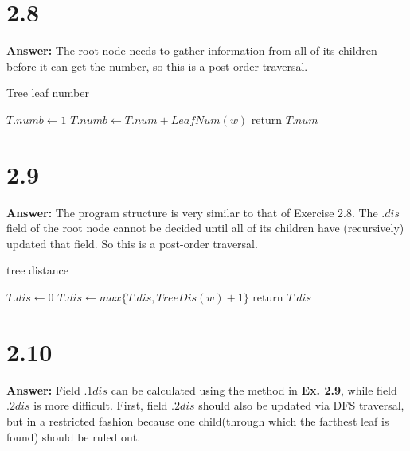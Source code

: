 \documentclass[a4paper,11pt]{article}
\theoremstyle{mytheor}
\begin{document}
\vspace{1.2in}

\section*{2.8}
\noindent\textbf{Answer:} The root node needs to gather information from all of its children before it can get the number, so this is a post-order traversal.

\begin{algorithm}[H]
\caption{Tree leaf number}\label{sec:TREEEVALUATION_2_8}
\begin{algorithmic}[1]
  \State $T.numb \gets 1$
   
    \State $T.numb \gets T.num + LeafNum(w)$
  \EndFor
  \State return $T.num$
\EndFunction
\end{algorithmic}
\end{algorithm}

\vspace{1.2in}

\section*{2.9}
\noindent\textbf{Answer:} The program structure is very similar to that of Exercise 2.8. The $.dis$ field of the root node cannot be decided until all of its children have (recursively) updated that field. So this is a post-order traversal.

\begin{algorithm}[H]
\caption{tree distance}\label{sec:TREEEVALUATION_2_9}
\begin{algorithmic}[1]
  \State $T.dis \gets 0$
    \State $T.dis \gets max\{ T.dis, TreeDis(w) + 1\}$
  \EndFor
  \State return $T.dis$
\EndFunction
\end{algorithmic}
\end{algorithm}

\vspace{1.2in}

\section*{2.10}
\noindent\textbf{Answer:} Field $.1dis$ can be calculated using the method in \textbf{Ex. 2.9}, while field $.2dis$ is more difficult. First, field $.2dis$ should also be updated via DFS traversal, but in a restricted fashion because one child(through which the farthest leaf is found) should be ruled out.
\end{document}

